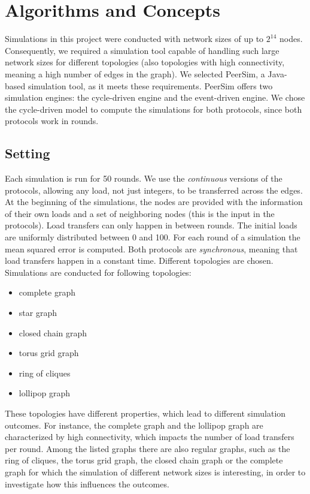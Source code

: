 \chapter{Algorithms and Concepts}\label{chap:background}


Simulations in this project were conducted with network sizes of up to $2^{14}$ nodes. Consequently, we required a simulation tool capable of handling such large network sizes for different topologies (also topologies with high connectivity, meaning a high number of edges in the graph). We selected PeerSim, a Java-based simulation tool, as it meets these requirements. PeerSim offers two simulation engines: the cycle-driven engine and the event-driven engine. We chose the cycle-driven model to compute the simulations for both protocols, since both protocols work in rounds.

\section{Setting}
Each simulation is run for 50 rounds. We use the \textit{continuous} versions of the protocols, allowing any load, not just integers, to be transferred across the edges. At the beginning of the simulations, the nodes are provided with the information of their own loads and a set of neighboring nodes (this is the input in the protocols). Load transfers can only happen in between rounds. The initial loads are uniformly distributed between 0 and 100. For each round of a simulation the mean squared error is computed. Both protocols are \textit{synchronous}, meaning that load transfers happen in a constant time. Different topologies are chosen. Simulations are conducted for following topologies:
\begin{itemize}
    \item complete graph
    \item star graph
    \item closed chain graph
    \item torus grid graph
    \item ring of cliques
    \item lollipop graph
\end{itemize}
These topologies have different properties, which lead to different simulation outcomes. For instance, the complete graph and the lollipop graph are characterized by high connectivity, which impacts the number of load transfers per round. Among the listed graphs there are also regular graphs, such as the ring of cliques, the torus grid graph, the closed chain graph or the complete graph for which the simulation of different network sizes is interesting, in order to investigate how this influences the outcomes.

